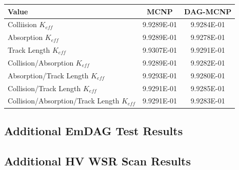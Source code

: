\documentclass[12pt, a4paper]{article}
\begin{document}
\begin{table}[H]
  \centering
  \begin{tabular}{l c c}
    \toprule
    Value & MCNP & DAG-MCNP \\
    \hline
    Colliision $K_{eff}$ & 9.9289E-01 &  9.9284E-01 \\
    \hline
    Absorption $K_{eff}$ & 9.9289E-01 & 9.9278E-01 \\
    \hline
    Track Length $K_{eff}$ & 9.9307E-01 & 9.9291E-01 \\
    \hline
    Collision/Absorption $K_{eff}$ & 9.9289E-01 & 9.9282E-01 \\
    \hline
    Absorption/Track Length $K_{eff}$ & 9.9293E-01 & 9.9280E-01 \\
    \hline
    Collision/Track Length $K_{eff}$ & 9.9291E-01 & 9.9285E-01 \\
    \hline 
    Collision/Absorption/Track Length $K_{eff}$ & 9.9291E-01 & 9.9283E-01 \\
    \bottomrule    
  \end{tabular}
\end{table}

\subsection{Additional EmDAG Test Results}%

\subsection{Additional HV WSR Scan Results}%
\end{document}
